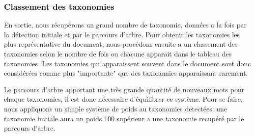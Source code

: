 \subsubsection{Classement des taxonomies}
En sortie, nous récupérons un grand nombre de taxonomie, données a la fois par la détection initiale et par le parcours d'arbre. Pour obtenir les taxonomies les plus représentative du document, nous procédons ensuite a un classement des taxonomies selon le nombre de fois ou chacune apparait dans le tableau des taxonomies. Les taxonomies qui apparaissent souvent dans le document sont donc considérées comme plus "importante" que des taxonomies apparaissant rarement.

Le parcours d'arbre apportant une très grande quantité de nouveaux mots pour chaque taxonomies, il est donc nécessaire d'équilibrer ce système. Pour se faire, nous appliquons un simple système de poids au taxonomies detectées: une taxonomie initiale aura un poids 100 supérieur a une taxonomie recupéré par le parcours d'arbre.


